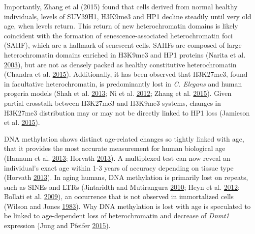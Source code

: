 \documentclass[onehalf,12pt]{beavtex}
\begin{document}
  Importantly, Zhang et al (2015) found that cells derived from normal
  healthy individuals, levels of SUV39H1, H3K9me3 and HP1 decline steadily
  until very old age, when levels return. This return of new
  heterochromatin domains is likely coincident with the formation of
  senescence-associated heterochromatin foci (SAHF), which are a hallmark
  of senescent cells. SAHFs are composed of large heterochromatin domains
  enriched in H3K9me3 and HP1 proteins (Narita et al.
  \protect\hyperlink{ref-NaritaRbmediatedheterochromatinformation2003}{2003}),
  but are not as densely packed as healthy constitutive heterochromatin
  (Chandra et al.
  \protect\hyperlink{ref-ChandraGlobalReorganizationNuclear2015}{2015}).
  Additionally, it has been observed that H3K27me3, found in facultative
  heterochromatin, is predominantly lost in \emph{C. Elegans} and human
  progeria models (Shah et al.
  \protect\hyperlink{ref-ShahLaminB1depletion2013}{2013}; Ni et al.
  \protect\hyperlink{ref-NiTwoSETdomain2012}{2012}; Zhang et al.
  \protect\hyperlink{ref-ZhangWernersyndromestem2015}{2015}). Given
  partial crosstalk between H3K27me3 and H3K9me3 systems, changes in
  H3K27me3 distribution may or may not be directly linked to HP1 loss
  (Jamieson et al.
  \protect\hyperlink{ref-JamiesonLossHP1causes2015}{2015}).
  
  DNA methylation shows distinct age-related changes so tightly linked
  with age, that it provides the most accurate measurement for human
  biological age (Hannum et al.
  \protect\hyperlink{ref-HannumGenomewidemethylationprofiles2013}{2013};
  Horvath \protect\hyperlink{ref-HorvathDNAmethylationage2013}{2013}). A
  multiplexed test can now reveal an individual's exact age within 1-3
  years of accuracy depending on tissue type (Horvath
  \protect\hyperlink{ref-HorvathDNAmethylationage2013}{2013}). In aging
  humans, DNA methylation is primarily lost on repeats, such as SINEs and
  LTRs (Jintaridth and Mutirangura
  \protect\hyperlink{ref-JintaridthDistinctivepatternsagedependent2010}{2010};
  Heyn et al. \protect\hyperlink{ref-HeynDistinctDNAmethylomes2012}{2012};
  Bollati et al.
  \protect\hyperlink{ref-BollatiDeclinegenomicDNA2009}{2009}), an
  occurrence that is not observed in immortalized cells (Wilson and Jones
  \protect\hyperlink{ref-WilsonDNAmethylationdecreases1983}{1983}). Why
  DNA methylation is lost with age is speculated to be linked to
  age-dependent loss of heterochromatin and decrease of \emph{Dnmt1}
  expression (Jung and Pfeifer
  \protect\hyperlink{ref-JungAgingDNAmethylation2015}{2015}).
  
\end{document}
